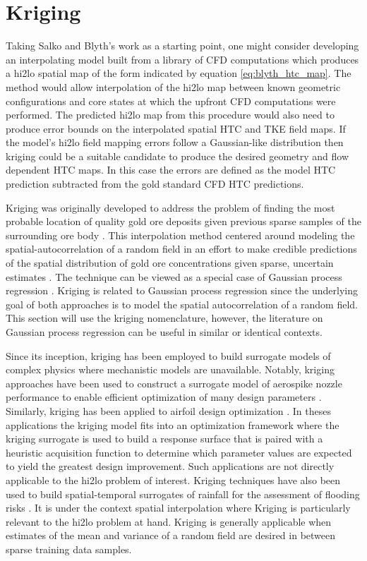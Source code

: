 \section{Kriging}

Taking Salko and Blyth's work as a starting point, one might consider developing an interpolating model built from a  library of CFD computations which produces a hi2lo spatial map of the form indicated by equation \ref{eq:blyth_htc_map}.  The method would allow interpolation of the hi2lo map between known geometric configurations and core states at which the upfront CFD computations were performed.  The predicted hi2lo map from this procedure would also need to produce error bounds on the interpolated spatial HTC and TKE field maps.  If the model's hi2lo field mapping errors follow a Gaussian-like distribution then kriging could be a suitable candidate to produce the desired geometry and flow dependent HTC maps.  In this case the errors are defined as the model HTC prediction subtracted from the gold standard CFD HTC predictions.

Kriging was originally developed to address the problem of finding the most probable location of quality gold ore deposits given previous sparse samples of the surrounding ore body \cite{krige51}.  This interpolation method centered around modeling the spatial-autocorrelation of a random field in an effort to make credible predictions of the spatial distribution of gold ore concentrations given sparse, uncertain estimates \cite{Krige51a}.   The technique can be viewed as a special case of Gaussian process regression \cite{Williams96}.  Kriging is related to Gaussian process regression since the underlying goal of both approaches is to model the spatial autocorrelation of a random field.  This section will use the kriging nomenclature, however, the literature on Gaussian process regression can be useful in similar or identical contexts.

Since its inception, kriging has been employed to build surrogate models of complex physics where mechanistic models are unavailable.  Notably, kriging approaches have been used to construct a surrogate model of aerospike nozzle performance to enable efficient optimization of many design parameters \cite{simpson2001kriging}.  Similarly, kriging has been applied to airfoil design optimization \cite{jeong2005efficient}.  In theses applications the kriging model fits into an optimization framework where the kriging surrogate is used to build a response surface that is paired with a heuristic acquisition function to determine which parameter values are expected to yield the greatest design improvement.  Such applications are not directly applicable to the hi2lo problem of interest.  Kriging techniques have also been used to build spatial-temporal surrogates of rainfall for the assessment of flooding risks \cite{hsu2011integrated}.  It is under the context spatial interpolation where Kriging is particularly relevant to the hi2lo problem at hand. Kriging is generally applicable when estimates of the mean and variance of a random field are desired in between sparse training data samples.  


